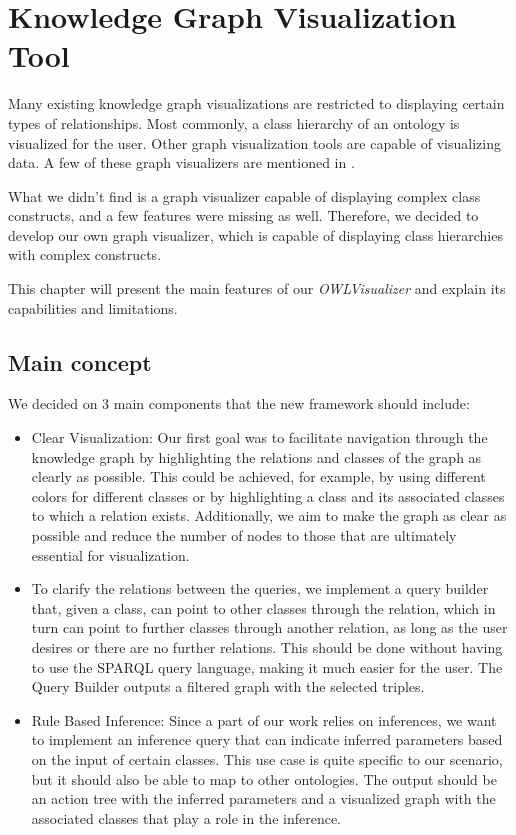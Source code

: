 \chapter{Knowledge Graph Visualization Tool}
\label{chap:OWLViz}
Many existing knowledge graph visualizations are restricted to displaying certain types of relationships. 
Most commonly, a class hierarchy of an ontology is visualized for the user. Other graph visualization tools are capable of visualizing data.
 A few of these graph visualizers are mentioned in .

What we didn't find is a graph visualizer capable of displaying complex class constructs, and a few features were missing as well.
Therefore, we decided to develop our own graph visualizer, which is capable of displaying class hierarchies with complex constructs.

This chapter will present the main features of our \textit{OWLVisualizer} and explain its capabilities and limitations.

\section{Main concept}
\label{sec:MainConceps}

We decided on 3 main components that the new framework should include:
\begin{itemize}
    \item Clear Visualization: Our first goal was to facilitate navigation through the knowledge graph by highlighting the relations and classes of the graph as clearly as possible. This could be achieved, for example, by using different colors for different classes or by highlighting a class and its associated classes to which a relation exists. Additionally, we aim to make the graph as clear as possible and reduce the number of nodes to those that are ultimately essential for visualization.
    \item To clarify the relations between the queries, we implement a query builder that, given a class, can point to other classes through the relation, which in turn can point to further classes through another relation, as long as the user desires or there are no further relations. This should be done without having to use the SPARQL query language, making it much easier for the user. The Query Builder outputs a filtered graph with the selected triples.
    \item Rule Based Inference: Since a part of our work relies on inferences, we want to implement an inference query that can indicate inferred parameters based on the input of certain classes. This use case is quite specific to our scenario, but it should also be able to map to other ontologies. The output should be an action tree with the inferred parameters and a visualized graph with the associated classes that play a role in the inference.
\end{itemize}

